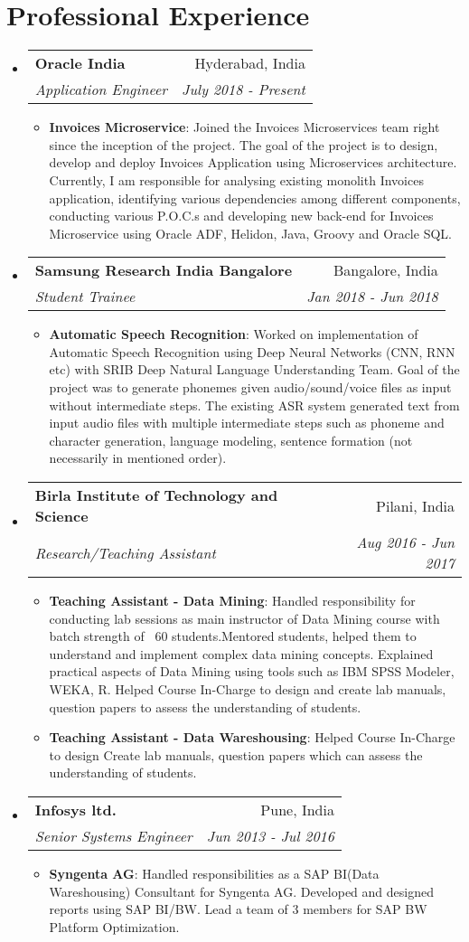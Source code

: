 \documentclass[letterpaper,11pt]{article}
\makeatletter
\newcommand{\resumeItem}[2]{
  \item\small{
    \textbf{#1}{: #2 \vspace{-2pt}}
  }
}
\newcommand{\resumeSubheading}[4]{
  \vspace{-1pt}\item
    \begin{tabular*}{0.97\textwidth}[t]{l@{\extracolsep{\fill}}r}
      \textbf{#1} & #2 \\
      \textit{\small#3} & \textit{\small #4} \\
    \end{tabular*}\vspace{-5pt}
}
\newcommand{\resumeSubHeadingListStart}{\begin{itemize}[leftmargin=*]}
\newcommand{\resumeSubHeadingListEnd}{\end{itemize}}
\newcommand{\resumeItemListStart}{\begin{itemize}}
\newcommand{\resumeItemListEnd}{\end{itemize}\vspace{-5pt}}
\makeatother
\begin{document}
\section{Professional Experience}
  \resumeSubHeadingListStart
    \resumeSubheading
      {Oracle India}{Hyderabad, India}
      {Application Engineer}{July 2018 - Present}
      \resumeItemListStart
        \resumeItem{Invoices Microservice}
      { Joined the Invoices Microservices team right      since the inception of the project. The goal of   the project is to design,         develop and     deploy Invoices Application using Microservices   architecture. 
        Currently, I am responsible for analysing existing monolith Invoices application, identifying various dependencies among different components, conducting various P.O.C.s and developing new back-end for Invoices Microservice using Oracle ADF, Helidon, Java, Groovy and Oracle SQL.}
      \resumeItemListEnd
    \resumeSubheading
      {Samsung Research India Bangalore}{Bangalore, India}
      {Student Trainee}{Jan 2018 - Jun 2018}
      \resumeItemListStart
        \resumeItem{Automatic Speech Recognition}
          { Worked on implementation of Automatic Speech Recognition using Deep Neural Networks (CNN, RNN etc) with  SRIB Deep Natural     Language Understanding Team. Goal of the project was to generate phonemes given audio/sound/voice files as input without intermediate steps. The existing   ASR system generated text from input audio files with multiple intermediate steps such as phoneme and character generation,   language modeling, sentence formation (not necessarily in mentioned order).}
      \resumeItemListEnd
    \resumeSubheading
      {Birla Institute of Technology and Science}{Pilani, India}
      {Research/Teaching Assistant}{Aug 2016 - Jun 2017}
      \resumeItemListStart
        \resumeItem{Teaching Assistant - Data Mining}
          {Handled responsibility for conducting lab sessions as main instructor of Data Mining course with batch      strength of ~60 students.Mentored students, helped them to understand and implement complex      data mining concepts. Explained practical aspects of Data Mining using tools such as IBM SPSS     Modeler, WEKA, R.
            Helped Course In-Charge to design and create lab manuals, question papers to assess the understanding of students.}
        \resumeItem{Teaching Assistant - Data Wareshousing}
          {Helped Course In-Charge to design  Create lab manuals, question papers which can assess the understanding of students.}
      \resumeItemListEnd
    \resumeSubheading
      {Infosys ltd.}{Pune, India}
      {Senior Systems Engineer}{Jun 2013 - Jul 2016}
      \resumeItemListStart
        \resumeItem{Syngenta AG}
          { Handled responsibilities as a SAP BI(Data Wareshousing) Consultant for Syngenta AG.
            Developed and designed reports using SAP BI/BW.
            Lead a team of 3 members for SAP BW Platform Optimization.}
      \resumeItemListEnd
  \resumeSubHeadingListEnd
  
\end{document}
